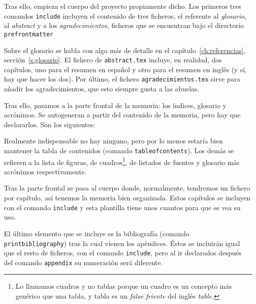 

Tras ello, empieza el cuerpo del proyecto propiamente dicho. Los primeros tres comandos \texttt{include} incluyen el contenido de tres ficheros, el referente al \textit{glosario}, al \textit{abstract} y a los \textit{agradecimientos}, ficheros que se encuentran bajo el directorio \texttt{prefrontmatter}



Sobre el glosario se habla con algo más de detalle en el capítulo~\ref{ch:referencias}, sección~\ref{s:glosario}. El fichero de \texttt{abstract.tex} incluye, en realidad, dos capítulos, uno para el resumen en español y otro para el resumen en inglés (y sí, hay que hacer los dos). Por último, el fichero \texttt{agradecimientos.tex} sirve para añadir los agradecimientos, que esto siempre gusta a las abuelas.

Tras ello, pasamos a la parte frontal de la memoria: los índices, glosario y acrónimos. Se autogeneran a partir del contenido de la memoria, pero hay que declararlos. Son los siguientes:



Realmente indispensable no hay ninguno, pero por lo menos estaría bien mantener la tabla de contenidos (comando \texttt{tableofcontents}). Los demás se refieren a la lista de figuras, de cuadros\footnote{Lo llamamos cuadros y no tablas porque un cuadro es un concepto más genérico que una tabla, y tabla es un \textit{false friente} del inglés \textit{table}.}, de listados de fuentes y glosario más acrónimos respectivamente.

Tras la parte frontal se pasa al cuerpo donde, normalmente, tendremos un fichero por capítulo, así tenemos la memoria bien organizada. Estos capítulos se incluyen con el comando \texttt{include} y esta plantilla tiene unos cuantos para que se vea su uso.

El último elemento que se incluye es la bibliografía (comando \texttt{printbibliography}) tras la cual vienen los apéndices. Éstos se incluirán igual que el resto de ficheros, con el comando \texttt{include}, pero al ir declarados después del comando \texttt{appendix} su numeración será diferente.

